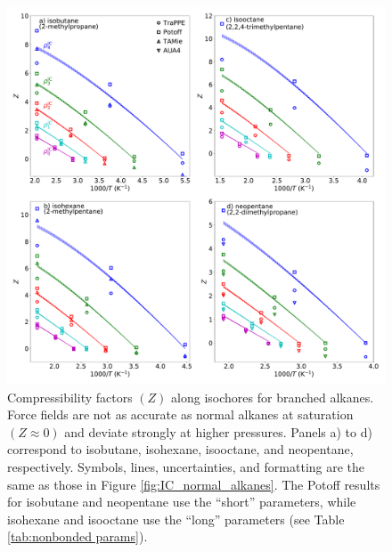 \documentclass[preprint,letterpaper,floatfix,citeautoscript,aip,jcp]{revtex4-1}
\begin{document}

\begin{figure}[p!]
	\centering
	\includegraphics[width=6.4in]{IC_branched_alkanes_all_models}
	\caption{Compressibility factors $(Z)$ along isochores for branched alkanes. Force fields are not as accurate as normal alkanes at saturation $(Z \approx 0)$ and deviate strongly at higher pressures. Panels a) to d) correspond to isobutane, isohexane, isooctane, and neopentane, respectively. Symbols, lines, uncertainties, and formatting are the same as those in Figure \ref{fig:IC_normal_alkanes}. The Potoff results for isobutane and neopentane use the ``short'' parameters, while isohexane and isooctane use the ``long'' parameters (see Table \ref{tab:nonbonded params}). \cite{Potoff_branched} }
	\label{fig:IC_branched_alkanes}
\end{figure}


\end{document}

